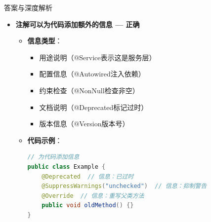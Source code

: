 \documentclass[12pt, a4paper]{ctexart}
\begin{document}
\begin{enumerate}[label=\textbf{\arabic*.}]
\begin{bluebox}{答案与深度解析}
\begin{itemize}[leftmargin=*, nosep, label={}]
\begin{itemize}[label={}, leftmargin=*, nosep]
\begin{lstlisting}[language=Java]
// Spring @Controller需要Spring容器扫描
@Controller  // 不在Spring容器中，不会被扫描注册
public class MyController {
}

// 需要配置：
// - Lombok：添加lombok依赖，IDE安装插件
// - Spring：配置@ComponentScan扫描包
				            \end{lstlisting}
				            \item \textbf{正确理解}：
				                  \begin{itemize}[label={}, nosep]
					                  \item 注解=信息标注
					                  \item 注解处理器/框架=根据注解执行逻辑
					                  \item 类比：标签（注解）+ 分拣器（处理器）= 分类行为
					                  \item 没有处理器的注解=没有分拣器的标签=无用
				                  \end{itemize}
				            \item \textbf{命题陷阱}：
				                  \begin{itemize}[label={}, nosep]
					                  \item 学生看到@Controller改变程序行为，以为是注解的作用
					                  \item 实际是Spring容器读取注解后采取的行动
					                  \item 注解只是"信息"，容器才是"行为执行者"
				                  \end{itemize}
			            \end{itemize}

			      \item[D] \textbf{注解可以为代码添加额外的信息 — 正确}
			            \begin{itemize}[label={}, leftmargin=*, nosep]
				            \item \textbf{信息类型}：
				                  \begin{itemize}[label={}, nosep]
					                  \item 用途说明（@Service表示这是服务层）
					                  \item 配置信息（@Autowired注入依赖）
					                  \item 约束检查（@NonNull检查非空）
					                  \item 文档说明（@Deprecated标记过时）
					                  \item 版本信息（@Version版本号）
				                  \end{itemize}
				            \item \textbf{代码示例}：
				                  \begin{lstlisting}[language=Java]
// 为代码添加信息
public class Example {
    @Deprecated  // 信息：已过时
    @SuppressWarnings("unchecked")  // 信息：抑制警告
    @Override  // 信息：重写父类方法
    public void oldMethod() {}
}


\end{lstlisting}
\end{itemize}
\end{itemize}
\end{bluebox}
\end{enumerate}
\end{document}
